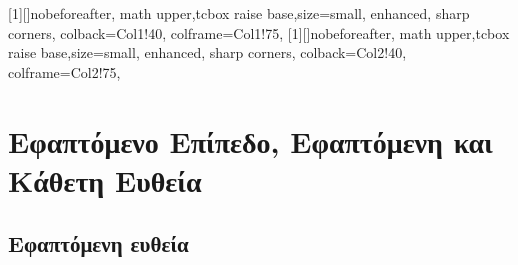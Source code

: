




\newtcbox{\mathboxrr}[1][]{nobeforeafter, math upper,tcbox raise base,size=small,
          enhanced, sharp corners, colback=Col1!40, colframe=Col1!75,
        }
\newtcbox{\mathboxrg}[1][]{nobeforeafter, math upper,tcbox raise base,size=small,
          enhanced, sharp corners, colback=Col2!40, colframe=Col2!75,
        }


\newcommand{\twocolumnsidescc}[2]{\begin{minipage}[c]{0.72\linewidth}\raggedright
        #1
        \end{minipage}\hfill\begin{minipage}[c]{0.27\linewidth}\raggedright
        #2
    \end{minipage}
}



\usepackage{wrapfig}

\pagestyle{vangelis}
\everymath{\displaystyle}
\setcounter{chapter}{1}





\chapter*{Εφαπτόμενο Επίπεδο, Εφαπτόμενη και Κάθετη Ευθεία}

\section*{Εφαπτόμενη ευθεία}


